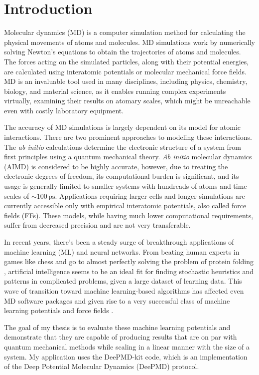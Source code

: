 \chapter{Introduction}

Molecular dynamics (MD) is a computer simulation method for calculating the
physical movements of atoms and molecules. MD simulations work by numerically
solving Newton's equations to obtain the trajectories of atoms and molecules.
The forces acting on the simulated particles, along with their potential
energies, are calculated using interatomic potentials or molecular mechanical
force fields. MD is an invaluable tool used in many disciplines, including
physics, chemistry, biology, and material science, as it enables running
complex experiments virtually, examining their results on atomary scales,
which might be unreachable even with costly laboratory equipment.

The accuracy of MD simulations is largely dependent on its model for atomic
interactions. There are two prominent approaches to modeling these
interactions. The \textit{ab initio} calculations determine the electronic
structure of a system from first principles using a quantum mechanical theory.
\textit{Ab initio} molecular dynamics (AIMD) is considered to be highly
accurate, however, due to treating the electronic degrees of freedom, its
computational burden is significant, and its usage is generally limited to
smaller systems with hundreads of atoms and time scales of
$\sim 100 \, \mathrm{ps}$. Applications requiring larger cells and longer
simulations are currently accessible only with empirical interatomic
potentials, also called force fields (FFs). These models, while having much
lower computational requirements, suffer from decreased precision and
are not very transferable.

In recent years, there's been a steady surge of breakthrough applications of
machine learning (ML) and neural networks. From beating human experts in
games like chess \cite{silver2017mastering} and go \cite{Lee_2016} to almost
perfectly solving the problem of protein folding \cite{Jumper2021}, artificial
intelligence seems to be an ideal fit for finding stochastic heuristics and
patterns in complicated problems, given a large dataset of learning data. This
wave of transition toward machine learning-based algorithms has affected even
MD software packages and given rise to a very successful class of machine
learning potentials and force fields \cite{doi:10.1021/acs.chemrev.0c01111}.

The goal of my thesis is to evaluate these machine learning potentials and
demonstrate that they are capable of producing results that are on par with
quantum mechanical methods while scaling in a linear manner with the size of a
system. My application uses the DeePMD-kit code, which is an implementation of
the Deep Potential Molecular Dynamics (DeePMD) protocol.

%
%
